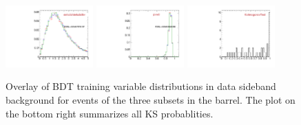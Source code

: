 \begin{figure}
  \includegraphics[width=0.3\textwidth]{Figures/VariablesComparison/Data_barrel_figs_3h/delta3dErr}
  \includegraphics[width=0.3\textwidth]{Figures/VariablesComparison/Data_barrel_figs_3h/pvw8}
  \includegraphics[width=0.3\textwidth]{Figures/VariablesComparison/Data_barrel_figs_3h/KS}
  \caption{Overlay of BDT training variable distributions in data sideband background for events of the three subsets in the barrel. The plot on the bottom right summarizes all KS probablities.}
  \label{fig:Data_barrel_figs_3h}
\end{figure}

